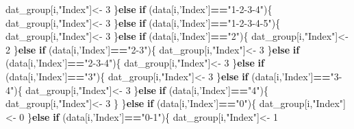 \documentclass[]{article}
\newenvironment{Shaded}{\begin{snugshade}}{\end{snugshade}}
\newcommand{\DecValTok}[1]{\textcolor[rgb]{0.00,0.00,0.81}{#1}}
\newcommand{\StringTok}[1]{\textcolor[rgb]{0.31,0.60,0.02}{#1}}
\newcommand{\ControlFlowTok}[1]{\textcolor[rgb]{0.13,0.29,0.53}{\textbf{#1}}}
\newcommand{\OperatorTok}[1]{\textcolor[rgb]{0.81,0.36,0.00}{\textbf{#1}}}
\newcommand{\NormalTok}[1]{#1}
\begin{document}
\begin{Shaded}
\begin{Highlighting}[]
\NormalTok{        dat_group[i,}\StringTok{"Index"}\NormalTok{]<-}\StringTok{ }\DecValTok{3}
\NormalTok{      \}}\ControlFlowTok{else} \ControlFlowTok{if}\NormalTok{ (data[i,}\StringTok{'Index'}\NormalTok{]}\OperatorTok{==}\StringTok{"1-2-3-4"}\NormalTok{)\{}
\NormalTok{        dat_group[i,}\StringTok{"Index"}\NormalTok{]<-}\StringTok{ }\DecValTok{3}
\NormalTok{      \}}\ControlFlowTok{else} \ControlFlowTok{if}\NormalTok{ (data[i,}\StringTok{'Index'}\NormalTok{]}\OperatorTok{==}\StringTok{"1-2-3-4-5"}\NormalTok{)\{}
\NormalTok{        dat_group[i,}\StringTok{"Index"}\NormalTok{]<-}\StringTok{ }\DecValTok{3}
\NormalTok{      \}}\ControlFlowTok{else} \ControlFlowTok{if}\NormalTok{ (data[i,}\StringTok{'Index'}\NormalTok{]}\OperatorTok{==}\StringTok{"2"}\NormalTok{)\{}
\NormalTok{        dat_group[i,}\StringTok{"Index"}\NormalTok{]<-}\StringTok{ }\DecValTok{2}
\NormalTok{      \}}\ControlFlowTok{else} \ControlFlowTok{if}\NormalTok{ (data[i,}\StringTok{'Index'}\NormalTok{]}\OperatorTok{==}\StringTok{"2-3"}\NormalTok{)\{}
\NormalTok{        dat_group[i,}\StringTok{"Index"}\NormalTok{]<-}\StringTok{ }\DecValTok{3}
\NormalTok{      \}}\ControlFlowTok{else} \ControlFlowTok{if}\NormalTok{ (data[i,}\StringTok{'Index'}\NormalTok{]}\OperatorTok{==}\StringTok{"2-3-4"}\NormalTok{)\{}
\NormalTok{        dat_group[i,}\StringTok{"Index"}\NormalTok{]<-}\StringTok{ }\DecValTok{3}
\NormalTok{      \}}\ControlFlowTok{else} \ControlFlowTok{if}\NormalTok{ (data[i,}\StringTok{'Index'}\NormalTok{]}\OperatorTok{==}\StringTok{"3"}\NormalTok{)\{}
\NormalTok{        dat_group[i,}\StringTok{"Index"}\NormalTok{]<-}\StringTok{ }\DecValTok{3}
\NormalTok{      \}}\ControlFlowTok{else} \ControlFlowTok{if}\NormalTok{ (data[i,}\StringTok{'Index'}\NormalTok{]}\OperatorTok{==}\StringTok{"3-4"}\NormalTok{)\{}
\NormalTok{        dat_group[i,}\StringTok{"Index"}\NormalTok{]<-}\StringTok{ }\DecValTok{3}
\NormalTok{      \}}\ControlFlowTok{else} \ControlFlowTok{if}\NormalTok{ (data[i,}\StringTok{'Index'}\NormalTok{]}\OperatorTok{==}\StringTok{"4"}\NormalTok{)\{}
\NormalTok{        dat_group[i,}\StringTok{"Index"}\NormalTok{]<-}\StringTok{ }\DecValTok{3}
\NormalTok{      \}}
\NormalTok{    \}}\ControlFlowTok{else}
  \ControlFlowTok{if}\NormalTok{ (data[i,}\StringTok{'Index'}\NormalTok{]}\OperatorTok{==}\StringTok{"0"}\NormalTok{)\{ }
\NormalTok{    dat_group[i,}\StringTok{"Index"}\NormalTok{]<-}\StringTok{ }\DecValTok{0}
\NormalTok{  \}}\ControlFlowTok{else} \ControlFlowTok{if}\NormalTok{ (data[i,}\StringTok{'Index'}\NormalTok{]}\OperatorTok{==}\StringTok{"0-1"}\NormalTok{)\{}
\NormalTok{    dat_group[i,}\StringTok{"Index"}\NormalTok{]<-}\StringTok{ }\DecValTok{1}

\end{Highlighting}
\end{Shaded}
\end{document}
